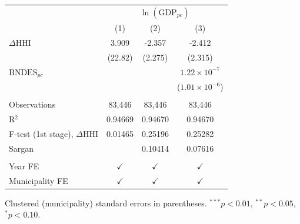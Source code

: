 \begingroup
\centering
\begin{tabular}{lccc}
   \toprule
    & \multicolumn{3}{c}{$\ln(\text{GDP}_{pc})$}\\
                                            & (1)           & (2)           & (3)\\  
   \midrule 
   $\Delta\text{HHI}$                       & 3.909         & -2.357        & -2.412\\   
                                            & (22.82)       & (2.275)       & (2.315)\\   
   $\text{BNDES}_{pc}$                      &               &               & $1.22\times 10^{-7}$\\    
                                            &               &               & ($1.01\times 10^{-6}$)\\    
    \\
   Observations                             & 83,446        & 83,446        & 83,446\\  
   R$^2$                                    & 0.94669       & 0.94670       & 0.94670\\  
   F-test (1st stage), $\Delta\text{HHI}$   & 0.01465       & 0.25196       & 0.25282\\  
   Sargan                                   &               & 0.10414       & 0.07616\\  
    \\
   Year FE                                  & $\checkmark$  & $\checkmark$  & $\checkmark$\\   
   Municipality FE                          & $\checkmark$  & $\checkmark$  & $\checkmark$\\   
   \bottomrule
\end{tabular}
 
\par \raggedright 
Clustered (municipality) standard errors in parentheses. $^{***}p<0.01$, $^{**}p<0.05$, $^{*}p<0.10$.
\par\endgroup
